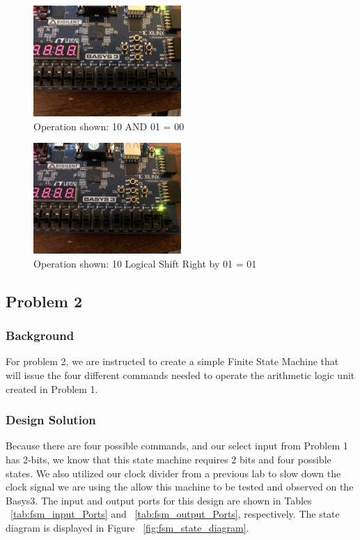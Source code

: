 \documentclass[11pt]{article}
\begin{document}
\begin{figure}[H]
\begin{center}
	\includegraphics[width=0.5\textwidth]{./images/p1/IMG_5830.jpg}
	\caption{\label{fig:alu_res7}Operation shown: 10 AND 01 = 00}
\end{center}
\end{figure}

\begin{figure}[H]
\begin{center}
	\includegraphics[width=0.5\textwidth]{./images/p1/IMG_7938.jpg}
	\caption{\label{fig:alu_res8}Operation shown: 10 Logical Shift Right by 01 = 01}
\end{center}
\end{figure}

\subsection{Problem 2 }

\subsubsection{Background}
For problem 2, we are instructed to create a simple Finite State Machine that will issue the four different commands needed to operate the arithmetic logic unit created in Problem 1.

\subsubsection{Design Solution}
Because there are four possible commands, and our select input from Problem 1 has 2-bits, we know that this state machine requires 2 bits and four possible states. We also utilized our clock divider from a previous lab to slow down the clock signal we are using the allow this machine to be tested and observed on the Basys3. The input and output ports for this design are shown in Tables ~\ref{tab:fsm_input_Ports} and ~\ref{tab:fsm_output_Ports}, respectively. The state diagram is displayed in Figure ~\ref{fig:fsm_state_diagram}.
\end{document}
